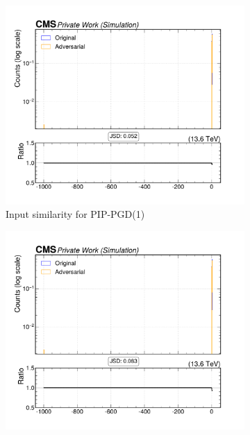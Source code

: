 \begin{figure}[htbp]
  \centering
  \begin{subfigure}[t]{0.32\textwidth}
    \includegraphics[width=\linewidth]{media/output/features/compare/combined_it_1/cmp_global_features_TagVarCSV_vertexCategory.pdf}
    \caption*{Input similarity for PIP-PGD(1)}
  \end{subfigure}\hfill
  \begin{subfigure}[t]{0.32\textwidth}
    \includegraphics[width=\linewidth]{media/output/features/compare/combined_it_2/cmp_global_features_TagVarCSV_vertexCategory.pdf}

\end{subfigure}
\end{figure}
